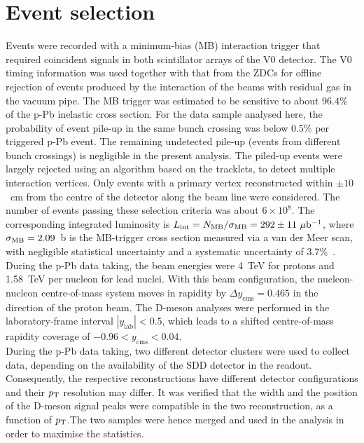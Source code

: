 \section{Event selection}
\label{sec:EvSelpPb}
Events were recorded with a minimum-bias (MB) interaction trigger 
that required coincident signals in both scintillator arrays of the V0 detector.
The V0 timing information was used together with that from the ZDCs for offline rejection 
of events produced by the interaction of the beams with residual gas in the vacuum pipe.
The MB trigger was estimated to be sensitive to about 96.4\% of the p-Pb inelastic cross section.
For the data sample analysed here, the probability of event pile-up in the 
same bunch crossing was below 0.5\% per triggered p-Pb event.
The remaining undetected pile-up (events from different bunch crossings) 
is negligible in the present analysis.
The piled-up events were largely rejected using an algorithm based on the tracklets,
to detect multiple interaction vertices.
Only events with a primary vertex reconstructed within $\pm 10$~cm from the 
centre of the detector along the beam line were considered. 
The number of events passing these selection criteria was about $6\times 10^8$.
The corresponding integrated luminosity is 
$L_{\rm int} =N_{\rm MB}/\sigma_{\rm MB}=292 \pm 11~\mu{\rm b}^{-1}$,
where $\sigma_{\rm MB}=2.09$~b is the MB-trigger cross section  
measured via a van der Meer scan, with negligible statistical uncertainty 
and a systematic uncertainty of 3.7\%~\cite{Abelev:2014epa}.
During the p-Pb data taking, the beam energies were 4~TeV for 
protons and 1.58~TeV per nucleon for lead nuclei. 
With this beam configuration, the nucleon-nucleon centre-of-mass system 
moves in rapidity by $\Delta y_{\mathrm{cms}}=0.465$ in the direction 
of the proton beam. The D-meson analyses were performed in 
the laboratory-frame interval $|y_{\mathrm{lab}}|<0.5$, 
which leads to a shifted centre-of-mass rapidity coverage 
of $-0.96 < y_{\mathrm{cms}} < 0.04$.\\


During the p-Pb data taking, two different detector clusters were used to collect data, depending on the 
availability of the SDD detector in the readout. Consequently, the respective reconstructions have different
detector configurations and their $p_{\rm T}$ resolution may differ. It was verified that the 
width and the position of the D-meson signal peaks were compatible in the two
reconstruction, as a function of $p_{\rm T}$.The two samples were hence merged and 
used in the analysis in order to maximise the statistics.

